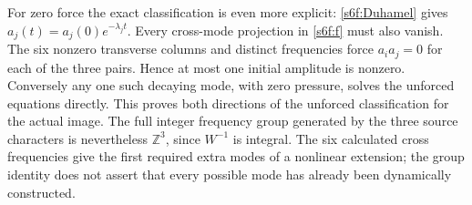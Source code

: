 For zero force the exact classification is even more explicit:
\eqref{s6f:Duhamel} gives $a_j(t)=a_j(0)e^{-\lambda_jt}$.
Every cross-mode projection in \eqref{s6f:f} must also vanish.
The six nonzero transverse columns and distinct frequencies force
$a_ia_j=0$ for each of the three pairs. Hence at most one initial
amplitude is nonzero. Conversely any one such decaying mode, with
zero pressure, solves the unforced equations directly. This proves
both directions of the unforced classification for the actual image.
The full integer frequency group generated by the three source
characters is nevertheless $\mathbb Z^3$, since $W^{-1}$ is integral.
The six calculated cross frequencies give the first required extra
modes of a nonlinear extension; the group identity does not assert
that every possible mode has already been dynamically constructed.

